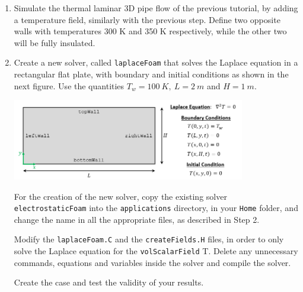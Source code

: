 \documentclass{article}
\begin{document}
\begin{enumerate}[2.1]
	
	\item Simulate the thermal laminar 3D pipe flow of the previous tutorial, by adding a temperature field, similarly with the previous step. Define two opposite walls with temperatures 300 K and 350 K respectively, while the other two will be fully insulated.
	
	\item Create a new solver, called {\tt laplaceFoam} that solves the Laplace equation in a rectangular flat plate, with boundary and initial conditions as shown in the next figure. Use the quantities $T_w=100~K,~L=2~m$ and $H=1~m$.
	
	
	\begin{center}
		\includegraphics[width=0.8\textwidth]{laplace.png}
	\end{center}

	For the creation of the new solver, copy the existing solver {\tt electrostaticFoam} into the {\tt applications} directory, in your {\tt Home} folder, and change the name in all the appropriate files, as described in Step 2.

	Modify the {\tt laplaceFoam.C} and the  {\tt createFields.H} files, in order to only solve the Laplace equation for the {\tt volScalarField} T. Delete any unnecessary commands, equations and variables inside the solver and compile the solver.

	Create the case and test the validity of your results.

	
\end{enumerate}
\end{document}
